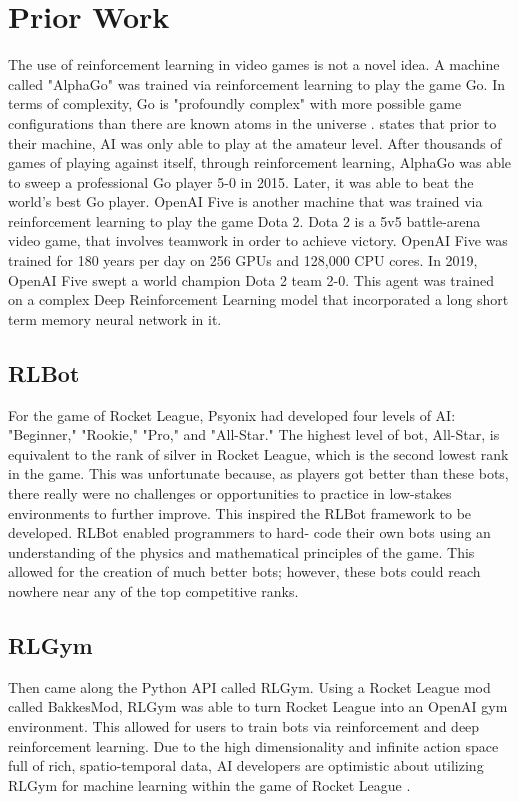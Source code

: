\documentclass[10pt,twocolumn]{article}
\begin{document}
\section{Prior Work}
 The use of reinforcement learning in video games is not a novel idea. A machine called "AlphaGo" was 
 trained via reinforcement learning to play the game Go. In terms of complexity, Go is "profoundly 
 complex" with more possible game configurations than there are known atoms in the universe 
 \cite{deepmind}. \textcite{deepmind} states that prior to their machine, AI was only able to play at the 
 amateur level. After thousands of games of playing against itself, through reinforcement learning, AlphaGo
 was able to sweep a professional Go player 5-0 in 2015. Later, it was able to beat the world's best Go 
 player. OpenAI Five is another machine that was trained via reinforcement learning to play the game Dota 
 2\cite{OpenAI_dota}. Dota 2 is a 5v5 battle-arena video game, that involves teamwork in order to achieve 
 victory. OpenAI Five was trained for 180 years per day on 256 GPUs and 128,000 CPU cores. In 2019, OpenAI 
 Five swept a world champion Dota 2 team 2-0. This agent was trained on a complex Deep Reinforcement 
 Learning model that incorporated a long short term memory neural network in it.

 
\subsection{RLBot}
 For the game of Rocket League, Psyonix had developed four levels of AI: "Beginner," "Rookie," "Pro," and 
 "All-Star." The highest level of bot, All-Star, is equivalent to the rank of silver in Rocket League, 
 which is the second lowest rank in the game. This was unfortunate because, as players got better than 
 these bots, there really were no challenges or opportunities to practice in low-stakes environments to 
 further improve. This inspired the RLBot framework to be developed. RLBot enabled programmers to hard- 
 code their own bots using an understanding of the physics and mathematical principles of the game. This 
 allowed for the creation of much better bots; however, these bots could reach nowhere near any of the top 
 competitive ranks.

\subsection{RLGym}
 Then came along the Python API called RLGym. Using a Rocket League mod called BakkesMod, RLGym was able to turn Rocket League into an OpenAI gym environment. This allowed for users to train bots via reinforcement and deep reinforcement learning. Due to the high dimensionality and infinite action space full of rich, spatio-temporal data, AI developers are optimistic about utilizing RLGym for machine learning within the game of Rocket League \cite{inproceedings}.
\end{document}
